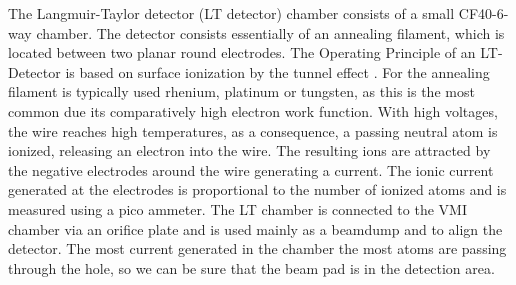 The Langmuir-Taylor detector (LT detector)  chamber consists of a small CF40-6-way chamber. The detector consists essentially of an annealing filament, which is located between two planar round electrodes. The Operating Principle of an LT-Detector is based on surface ionization by the tunnel effect \cite{delhuille_optimization_2002}. For the annealing filament is typically used  rhenium, platinum or tungsten, as this is the most common due its comparatively high electron work function. With high voltages, the wire reaches high temperatures, as a consequence, a passing neutral atom is ionized, releasing an electron into the wire. The resulting ions are attracted by the negative electrodes around the wire generating a current. The ionic current generated at the electrodes is proportional to the number of ionized atoms and is measured using a pico ammeter.
The LT chamber is connected to the VMI chamber via an orifice plate and is used mainly as a beamdump and to align the detector. The most current generated in the chamber the most atoms are passing through the  hole, so we can be sure that the beam pad is in the detection area.
